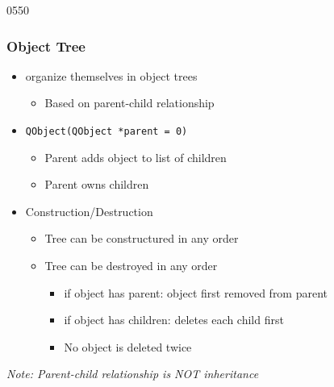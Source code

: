 \begin{slide}[fragile]{0550} \label{parent_child} \frametitle{Object Tree}
\begin{itemize}
  \item {} organize themselves in object trees
    \begin{itemize}
    \item Based on parent-child relationship
    \end{itemize}
  \item \texttt{QObject(QObject *parent = 0)}
    \begin{itemize}
    \item Parent adds object to list of children
    \item Parent owns children
    \end{itemize}
  \item Construction/Destruction
    \begin{itemize}
   \item Tree can be constructured in any order
    \item Tree can be destroyed in any order
      \begin{itemize}
      \item if object has parent: object first removed from parent
      \item if object has children: deletes each child first
      \item No object is deleted twice
      \end{itemize}
    \end{itemize}
 \end{itemize}
 \medskip
  \textit{Note: Parent-child relationship is NOT inheritance}
\end{slide}


